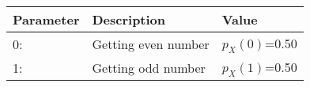\begin{tabular}{|l|l|l|}\hline
\textbf{Parameter } & \textbf{Description} & \textbf{Value} \\
\hline
0:	 &Getting even number& $p_X(0)$=0.50\\\hline
1:	 &Getting odd number& $p_X(1)$=0.50 \\\hline
\end{tabular}
